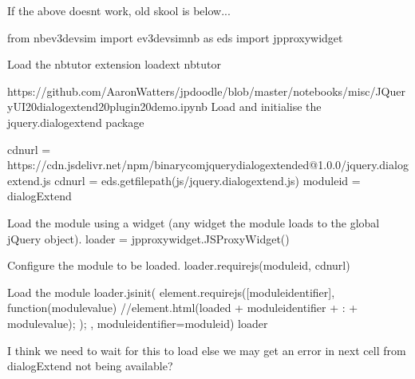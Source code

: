 \documentclass[letterpaper,10pt,english]{sphinxmanual}
\begin{document}
{{
\begin{sphinxVerbatim}[commandchars=\\\{\}]
\llap{\color{nbsphinxin}[ ]:\,\hspace{\fboxrule}\hspace{\fboxsep}}\PYGZsh{} If the above doesn\PYGZsq{}t work, old skool is below...
\end{sphinxVerbatim}
}

{
\begin{sphinxVerbatim}[commandchars=\\\{\}]
\llap{\color{nbsphinxin}[ ]:\,\hspace{\fboxrule}\hspace{\fboxsep}}from nbev3devsim import ev3devsim\PYGZus{}nb as eds
import jp\PYGZus{}proxy\PYGZus{}widget

\PYGZsh{}Load the nbtutor extension
\PYGZpc{}load\PYGZus{}ext nbtutor

\PYGZsh{}https://github.com/AaronWatters/jp\PYGZus{}doodle/blob/master/notebooks/misc/JQueryUI\PYGZpc{}20dialogextend\PYGZpc{}20plugin\PYGZpc{}20demo.ipynb
\PYGZsh{}Load and initialise the jquery.dialogextend package

cdn\PYGZus{}url = \PYGZdq{}https://cdn.jsdelivr.net/npm/binary\PYGZhy{}com\PYGZhy{}jquery\PYGZhy{}dialogextended@1.0.0/jquery.dialogextend.js\PYGZdq{}
cdn\PYGZus{}url = eds.get\PYGZus{}file\PYGZus{}path(\PYGZsq{}js/jquery.dialogextend.js\PYGZsq{})
module\PYGZus{}id = \PYGZdq{}dialogExtend\PYGZdq{}

\PYGZsh{} Load the module using a widget (any widget \PYGZhy{}\PYGZhy{} the module loads to the global jQuery object).
loader = jp\PYGZus{}proxy\PYGZus{}widget.JSProxyWidget()

\PYGZsh{} Configure the module to be loaded.
loader.require\PYGZus{}js(module\PYGZus{}id, cdn\PYGZus{}url)

\PYGZsh{} Load the module
loader.js\PYGZus{}init(\PYGZdq{}\PYGZdq{}\PYGZdq{}
    element.requirejs([module\PYGZus{}identifier], function(module\PYGZus{}value) \PYGZob{}
        //element.html(\PYGZdq{}loaded \PYGZdq{} + module\PYGZus{}identifier + \PYGZdq{} : \PYGZdq{} + module\PYGZus{}value);
    \PYGZcb{});
\PYGZdq{}\PYGZdq{}\PYGZdq{}, module\PYGZus{}identifier=module\PYGZus{}id)
loader

\PYGZsh{} I think we need to wait for this to load
\PYGZsh{} else we may get an error in next cell from dialogExtend not being available?
\end{sphinxVerbatim}
}

}
\end{document}
